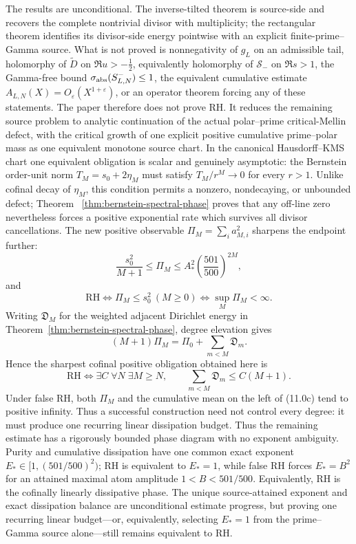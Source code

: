 \documentclass[11pt]{article}
\newcommand{\cS}{\mathcal S}
\begin{document}
The results are unconditional.  The inverse-tilted theorem is source-side and recovers the
complete nontrivial divisor with multiplicity; the rectangular theorem identifies its
divisor-side energy pointwise with an explicit finite-prime--Gamma source.  What is not proved is
nonnegativity of $g_L$ on an admissible tail, holomorphy of $\widetilde D$ on
$\Re u>-\frac12$, equivalently
holomorphy of $\cS_-$ on $\Re s>1$, the Gamma-free bound
$\sigma_{\rm abs}(S_{L,N}^-)\le1$, the equivalent cumulative estimate
$A_{L,N}(X)=O_\varepsilon(X^{1+\varepsilon})$, or an operator theorem forcing any of these
statements.  The paper
therefore does not prove RH.  It reduces the remaining source problem to analytic continuation of
the actual polar--prime critical-Mellin defect, with the critical growth of one explicit positive
cumulative prime--polar mass as one equivalent monotone source chart.  In the canonical
Hausdorff--KMS chart one equivalent obligation is scalar and genuinely
asymptotic: the Bernstein order-unit norm
$T_M=s_0+2\eta_M$ must satisfy $T_M/r^M\to0$ for every $r>1$.  Unlike cofinal decay of
$\eta_M$, this condition permits a nonzero, nondecaying, or unbounded defect; Theorem~
\ref{thm:bernstein-spectral-phase} proves that any off-line zero nevertheless forces a positive
exponential rate which survives all divisor cancellations.  The new positive observable
$\Pi_M=\sum_i a_{M,i}^2$ sharpens the endpoint further:
\[
 \frac{s_0^2}{M+1}\le\Pi_M\le
 A_*^2\left(\frac{501}{500}\right)^{2M},
 \tag{11.0}
\]
and
\[
 \mathrm{RH}\Longleftrightarrow \Pi_M\le s_0^2\ (M\ge0)
 \Longleftrightarrow \sup_M\Pi_M<\infty.
 \tag{11.0a}
\]
Writing $\mathfrak D_M$ for the weighted adjacent Dirichlet energy in
Theorem~\ref{thm:bernstein-spectral-phase}, degree elevation gives
\[
 (M+1)\Pi_M=\Pi_0+\sum_{m<M}\mathfrak D_m.
 \tag{11.0b}
\]
Hence the sharpest cofinal positive obligation obtained here is
\[
 \mathrm{RH}\Longleftrightarrow
 \exists C\;\forall N\;\exists M\ge N,\qquad
 \sum_{m<M}\mathfrak D_m\le C(M+1).
 \tag{11.0c}
\]
Under false RH, both $\Pi_M$ and the cumulative mean on the left of
\textup{(11.0c)} tend to positive infinity.  Thus a successful construction need not control
every degree: it must produce one recurring linear dissipation budget.
Thus the remaining estimate has a rigorously bounded phase diagram with no exponent ambiguity.
Purity and cumulative dissipation have one common exact exponent
$E_*\in[1,(501/500)^2)$; RH is equivalent to $E_*=1$, while false RH forces $E_*=B^2$ for an
attained maximal atom amplitude
$1<B<501/500$.  Equivalently, RH is the cofinally linearly dissipative phase.  The unique
source-attained exponent and exact dissipation balance are unconditional estimate progress, but
proving one recurring linear budget---or, equivalently, selecting $E_*=1$ from the prime--Gamma
source alone---still remains equivalent to RH.
\end{document}
